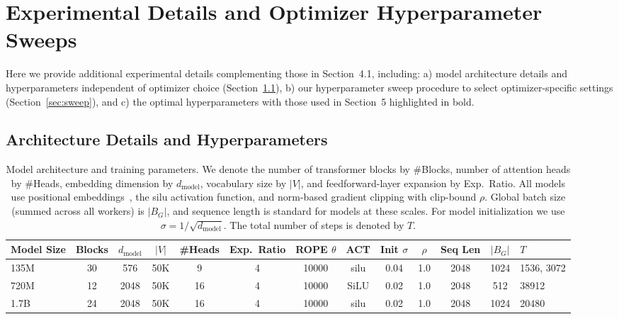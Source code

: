
\appendix

\section{Experimental Details and Optimizer Hyperparameter Sweeps}
\label{sec:appendix_a}

Here we provide additional experimental details complementing those in Section~4.1, including: a) model architecture details and hyperparameters independent of optimizer choice (Section~\ref{sec:arch_details}), b) our hyperparameter sweep procedure to select optimizer-specific settings (Section~\ref{sec:sweep}), and c) the optimal hyperparameters with those used in Section~5 highlighted in bold.

\subsection{Architecture Details and Hyperparameters}
\label{sec:arch_details}

\begin{table}[h]
\centering
\caption{Model architecture and training parameters. We denote the number of transformer blocks by \#Blocks, number of attention heads by \#Heads, embedding dimension by $d_{\text{model}}$, vocabulary size by $|V|$, and feedforward-layer expansion by Exp.\ Ratio. All models use positional embeddings~\citep{su2024roformer}, the silu activation function, and norm-based gradient clipping with clip-bound $\rho$. Global batch size (summed across all workers) is $|B_G|$, and sequence length is standard for models at these scales. For model initialization we use $\sigma = 1/\sqrt{d_{\text{model}}}$. The total number of steps is denoted by $T$.}
\label{tab:arch}
\begin{tabular}{lccccccccccc}
\toprule
Model Size & Blocks & $d_{\text{model}}$ & $|V|$ & \#Heads & Exp.\ Ratio & ROPE $\theta$ & ACT & Init $\sigma$ & $\rho$ & Seq Len & $|B_G|$ & $T$ \\
\midrule
135M & 30 & 576  & 50K & 9  & 4 & 10000 & silu & 0.04 & 1.0 & 2048 & 1024 & 1536, 3072 \\
720M & 12 & 2048 & 50K & 16 & 4 & 10000 & SiLU & 0.02 & 1.0 & 2048 & 512  & 38912 \\
1.7B & 24 & 2048 & 50K & 16 & 4 & 10000 & silu & 0.02 & 1.0 & 2048 & 1024 & 20480 \\
\bottomrule
\end{tabular}
\end{table}

